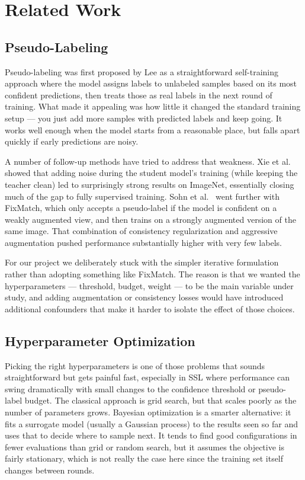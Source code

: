 \documentclass[journal]{IEEEtran}
\begin{document}
\section{Related Work}

\subsection{Pseudo-Labeling}

Pseudo-labeling was first proposed by Lee \cite{lee2013pseudolabel} as a
straightforward self-training approach where the model assigns labels to
unlabeled samples based on its most confident predictions, then treats those
as real labels in the next round of training. What made it appealing was how
little it changed the standard training setup --- you just add more samples
with predicted labels and keep going. It works well enough when the model
starts from a reasonable place, but falls apart quickly if early predictions
are noisy.

A number of follow-up methods have tried to address that weakness. Xie et
al.\ \cite{xie2020selftraining} showed that adding noise during the student
model's training (while keeping the teacher clean) led to surprisingly strong
results on ImageNet, essentially closing much of the gap to fully supervised
training. Sohn et al.\ \cite{sohn2020fixmatch} went further with FixMatch,
which only accepts a pseudo-label if the model is confident on a weakly
augmented view, and then trains on a strongly augmented version of the same
image. That combination of consistency regularization and aggressive
augmentation pushed performance substantially higher with very few labels.

For our project we deliberately stuck with the simpler iterative formulation
rather than adopting something like FixMatch. The reason is that we wanted the
hyperparameters --- threshold, budget, weight --- to be the main variable
under study, and adding augmentation or consistency losses would have
introduced additional confounders that make it harder to isolate the effect of
those choices.

\subsection{Hyperparameter Optimization}

Picking the right hyperparameters is one of those problems that sounds
straightforward but gets painful fast, especially in SSL where performance can
swing dramatically with small changes to the confidence threshold or
pseudo-label budget. The classical approach is grid search, but that scales
poorly as the number of parameters grows. Bayesian optimization
\cite{snoek2012practical} is a smarter alternative: it fits a surrogate model
(usually a Gaussian process) to the results seen so far and uses that to
decide where to sample next. It tends to find good configurations in fewer
evaluations than grid or random search, but it assumes the objective is fairly
stationary, which is not really the case here since the training set itself
changes between rounds.
\end{document}
